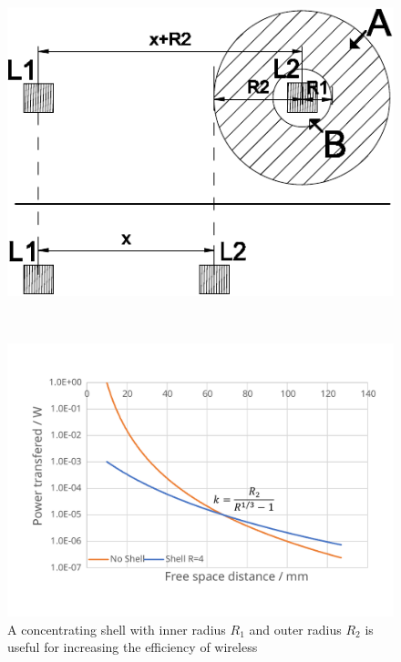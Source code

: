 \documentclass[11pt]{iopart}
\begin{document}
\begin{figure}
  \begin{center}
    \vspace{-1em}
    \begin{minipage}{0.35\linewidth}
   \noindent\includegraphics[width=\linewidth]{images/free_space.pdf}
    \end{minipage}
   ~
    \begin{minipage}{0.48\linewidth}
    \vspace{1em}\includegraphics[width=\linewidth]{images/dist_motiv.pdf}
    \end{minipage}
  \end{center}
  \caption{A concentrating shell with inner radius $R_1$ and outer
    radius $R_2$ is useful for increasing the efficiency of wireless
}
\end{figure}
\end{document}
